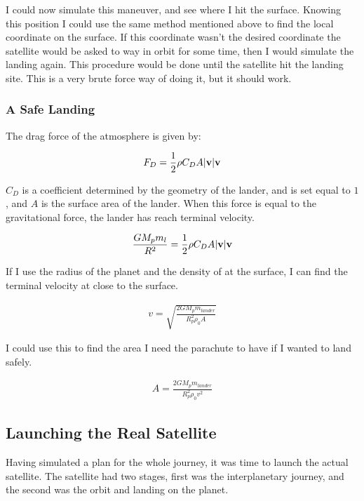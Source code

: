 \documentclass[a4paper, 10pt]{article}
\begin{document}
I could now simulate this maneuver, and see where I hit the surface. Knowing this position I could use the same method mentioned above to find the local coordinate on the surface. If this coordinate wasn't the desired coordinate the satellite would be asked to way in orbit for some time, then I would simulate the landing again. This procedure would be done until the satellite hit the landing site. This is a very brute force way of doing it, but it should work. 

\subsubsection{A Safe Landing}

The drag force of the atmosphere is given by:

\begin{align}
F_D = \frac{1}{2}\rho C_D A |\bold{v}| \bold{v}
\end{align}

$C_D$ is a coefficient determined by the geometry of the lander, and is set equal to $1$, and $A$ is the surface area of the lander. When this force is equal to the gravitational force, the lander has reach terminal velocity.

\begin{align}
\frac{GM_p m_l}{R^2} = \frac{1}{2}\rho C_D A |\bold{v}| \bold{v}
\end{align}

If I use the radius of the planet and the density of at the surface, I can find the terminal velocity at close to the surface.

\begin{align}
v = \sqrt{\frac{2GM_p m_{lander}}{R_p^2 \rho_0 A}}
\end{align}

I could use this to find the area I need the parachute to have if I wanted to land safely. 

\begin{align}
A = \frac{2GM_p m_{lander}}{R_p^2 \rho_0 v^2}
\end{align}


\subsection{Launching the Real Satellite}
Having simulated a plan for the whole journey, it was time to launch the actual satellite. The satellite had two stages, first was the interplanetary journey, and the second was the orbit and landing on the planet.\\
\end{document}
